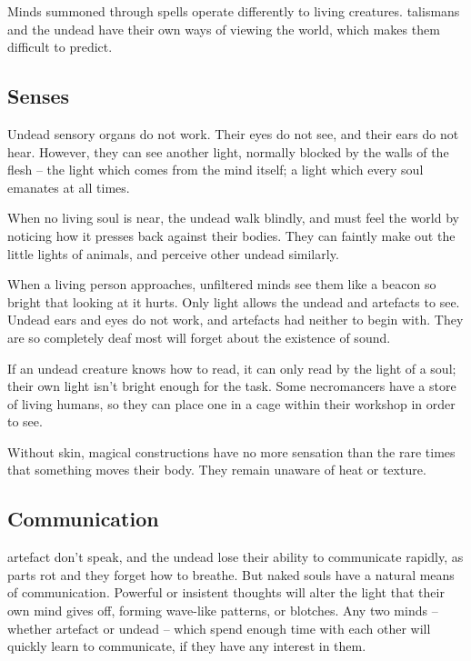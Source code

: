 \begin{multicols}{2}

\noindent
Minds summoned through spells operate differently to living creatures.
\Glspl{talisman} and the undead have their own ways of viewing the world, which makes them difficult to predict.

\subsection[The undead are deaf and blind, but see by the light of living souls]{Senses}
\label{undead_senses}
\label{artefact_senses}

Undead sensory organs do not work.
Their eyes do not see, and their ears do not hear.
However, they can see another light, normally blocked by the walls of the flesh -- the light which comes from the mind itself; a light which every soul emanates at all times.

When no living soul is near, the undead walk blindly, and must feel the world by noticing how it presses back against their bodies.
They can faintly make out the little lights of animals, and perceive other undead similarly.

When a living person approaches, unfiltered minds see them like a beacon so bright that looking at it hurts.
Only light allows the undead and \glspl{artefact} to see.
Undead ears and eyes do not work, and \glspl{artefact} had neither to begin with.
They are so completely deaf most will forget about the existence of sound.

If an undead creature knows how to read, it can only read by the light of a soul; their own light isn't bright enough for the task.
Some necromancers have a store of living humans, so they can place one in a cage within their workshop in order to see.

Without skin, magical constructions have no more sensation than the rare times that something moves their body.
They remain unaware of heat or texture.

\subsection{Communication}
\label{dead_communication}

\Gls{artefact} don't speak, and the undead lose their ability to communicate rapidly, as parts rot and they forget how to breathe.
But naked souls have a natural means of communication.
Powerful or insistent thoughts will alter the light that their own mind gives off, forming wave-like patterns, or blotches.
Any two minds -- whether \gls{artefact} or undead -- which spend enough time with each other will quickly learn to communicate, if they have any interest in them.

\end{multicols}

